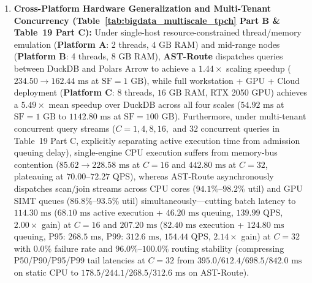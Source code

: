 \documentclass[10pt,a4paper]{article}
\begin{document}
\begin{enumerate}[leftmargin=1.5em,itemsep=2pt]
    \item \textbf{Cross-Platform Hardware Generalization and Multi-Tenant Concurrency (Table~\ref{tab:bigdata_multiscale_tpch} Part B \& Table~19 Part C):} Under single-host resource-constrained thread/memory emulation (\textbf{Platform A}: 2 threads, $4\text{ GB}$ RAM) and mid-range nodes (\textbf{Platform B}: 4 threads, $8\text{ GB}$ RAM), \textbf{AST-Route} dispatches queries between DuckDB and Polars Arrow to achieve a $1.44\times$ scaling speedup ($234.50 \rightarrow 162.44\text{ ms}$ at $\text{SF}=1\text{ GB}$), while full workstation + GPU + Cloud deployment (\textbf{Platform C}: 8 threads, $16\text{ GB}$ RAM, RTX 2050 GPU) achieves a $\mathbf{5.49\times}$ mean speedup over DuckDB across all four scales ($54.92\text{ ms}$ at $\text{SF}=1\text{ GB}$ to $1142.80\text{ ms}$ at $\text{SF}=100\text{ GB}$). Furthermore, under multi-tenant concurrent query streams ($C=1, 4, 8, 16,$ and $32$ concurrent queries in Table~19 Part C, explicitly separating active execution time from admission queuing delay), single-engine CPU execution suffers from memory-bus contention ($85.62 \rightarrow 228.58\text{ ms}$ at $C=16$ and $442.80\text{ ms}$ at $C=32$, plateauing at $70.00\text{--}72.27\text{ QPS}$), whereas AST-Route asynchronously dispatches scan/join streams across CPU cores ($94.1\%\text{--}98.2\%$ util) and GPU SIMT queues ($86.8\%\text{--}93.5\%$ util) simultaneously---cutting batch latency to $114.30\text{ ms}$ ($68.10\text{ ms}$ active execution + $46.20\text{ ms}$ queuing, $139.99\text{ QPS}$, $2.00\times$ gain) at $C=16$ and $207.20\text{ ms}$ ($82.40\text{ ms}$ execution + $124.80\text{ ms}$ queuing, P95: $268.5\text{ ms}$, P99: $312.6\text{ ms}$, $154.44\text{ QPS}$, $2.14\times$ gain) at $C=32$ with $0.0\%$ failure rate and $96.0\%\text{--}100.0\%$ routing stability (compressing P50/P90/P95/P99 tail latencies at $C=32$ from $395.0/612.4/698.5/842.0\text{ ms}$ on static CPU to $178.5/244.1/268.5/312.6\text{ ms}$ on AST-Route).

\end{enumerate}
\end{document}
